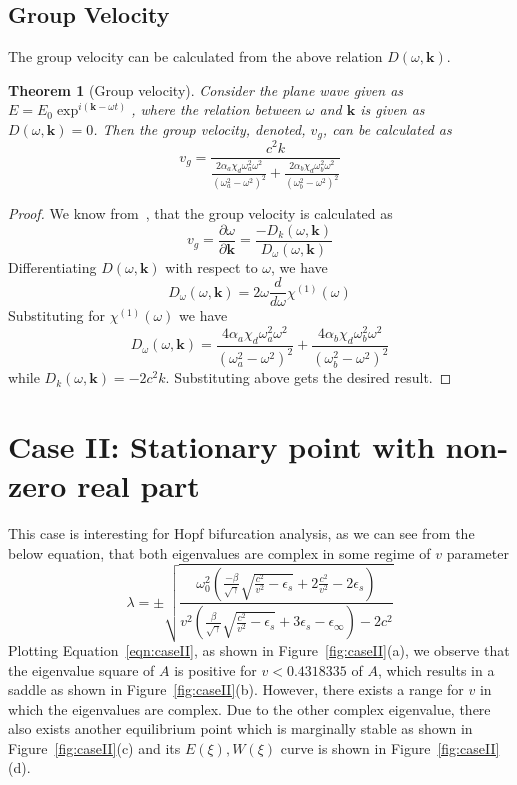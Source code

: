 \documentclass{article}[12pt]
\theoremstyle{plain}
\newtheorem{thm}{Theorem}
\begin{document}
\subsection{Group Velocity}
The group velocity can be calculated from the above relation $D(\omega,\mathbf{k})$.
\begin{thm}[Group velocity]
Consider the plane wave given as $E=E_0\exp^{i(\mathbf{k}-\omega t)}$, where the relation between $\omega$ and $\mathbf{k}$ is
given as $D(\omega,\mathbf{k})=0$. Then the group velocity, denoted, $v_g$, can be calculated as
\[
v_g = \frac{c^2k}{ \frac{2\alpha_a \chi_d \omega_a^2 \omega^2}{(\omega_a^2-\omega^2)^2} + 
\frac{2\alpha_b \chi_d \omega_b^2 \omega^2}{(\omega_b^2-\omega^2)^2} }
\]
\end{thm}
\begin{proof}
We know from~\cite{brio2010numerical}, that the group velocity is calculated as
\[
v_g = \frac{\partial \omega}{\partial \mathbf{k}} = \frac{-D_k(\omega,\mathbf{k})}{D_\omega(\omega,\mathbf{k})} 
\]
Differentiating $D(\omega,\mathbf{k})$ with respect to $\omega$, we have
\[
D_\omega(\omega,\mathbf{k}) = 2 \omega \frac{d}{d\omega} \chi^{(1)}(\omega)
\]
Substituting for $\chi^{(1)}(\omega)$ we have
\[
D_\omega(\omega,\mathbf{k})  = \frac{4\alpha_a \chi_d \omega_a^2 \omega^2}{(\omega_a^2-\omega^2)^2} + 
\frac{4\alpha_b \chi_d \omega_b^2 \omega^2}{(\omega_b^2-\omega^2)^2} 
\]
while $D_k(\omega,\mathbf{k})=-2c^2 k$. Substituting above gets the desired result.
\end{proof}

\section{Case II: Stationary point with non-zero real part}
This case is interesting for Hopf bifurcation analysis, as we can see from the below equation, that both eigenvalues are complex
in some regime of $v$ parameter
\[
\lambda  =  \pm \sqrt{\frac{\omega_0^2 (\frac{-\beta}{\sqrt{\gamma}}\sqrt{\frac{c^2}{v^2}-\epsilon_s} + 2\frac{c^2}{v^2} - 2\epsilon_s)}
{v^2(\frac{\beta}{\sqrt{\gamma}}\sqrt{\frac{c^2}{v^2}-\epsilon_s} + 3\epsilon_s - \epsilon_\infty) -2c^2}}
\]
Plotting Equation~\ref{eqn:caseII}, as shown in Figure~\ref{fig:caseII}(a), we observe that the eigenvalue square of $A$ is positive for $v<0.4318335$
of $A$, which results in a saddle as shown in Figure~\ref{fig:caseII}(b). However, there exists a range for $v$ in which
the eigenvalues are complex. Due to the other complex eigenvalue, there also exists another equilibrium
point which is marginally stable as shown in Figure~\ref{fig:caseII}(c)
and its $E(\xi),W(\xi)$ curve is shown in Figure~\ref{fig:caseII}(d).
\end{document}
